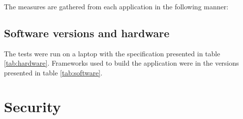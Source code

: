 The measures are gathered from each application in the following manner:



\subsection{Software versions and hardware}

The tests were run on a laptop with the specification presented in table \ref{tab:hardware}.
Frameworks used to build the application were in the versions presented in table \ref{tab:software}.






\section{Security}
